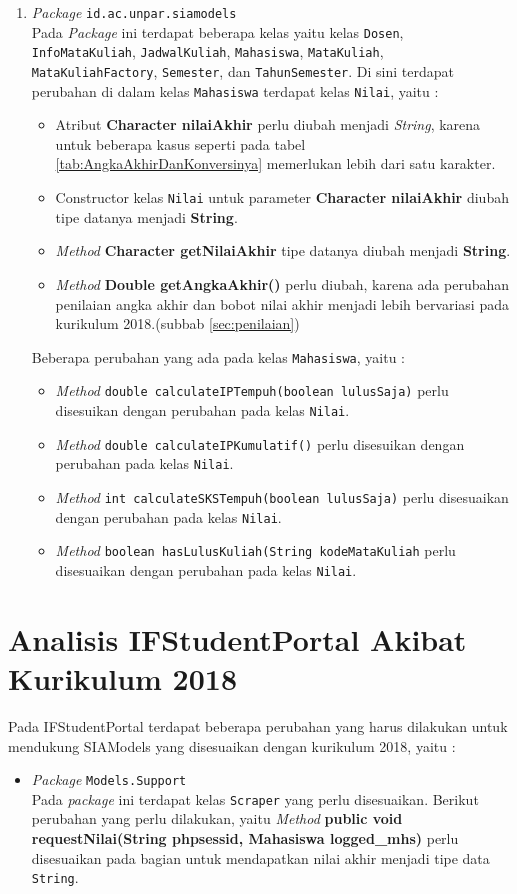\begin{enumerate}
	\item \textit{Package} \texttt{id.ac.unpar.siamodels}\\
	Pada \textit{Package} ini terdapat beberapa kelas yaitu kelas \texttt{Dosen}, \texttt{InfoMataKuliah}, \texttt{JadwalKuliah}, \texttt{Mahasiswa}, \texttt{MataKuliah}, \texttt{MataKuliahFactory}, \texttt{Semester}, dan \texttt{TahunSemester}. Di sini terdapat perubahan di dalam kelas \texttt{Mahasiswa} terdapat kelas \texttt{Nilai}, yaitu :
	\begin{itemize}
		\item Atribut \textbf{Character nilaiAkhir} perlu diubah menjadi \textit{String}, karena untuk beberapa kasus seperti pada tabel \ref{tab:AngkaAkhirDanKonversinya} memerlukan lebih dari satu karakter.
		\item Constructor kelas \texttt{Nilai} untuk parameter \textbf{Character nilaiAkhir} diubah tipe datanya menjadi \textbf{String}.
		\item \textit{Method} \textbf{Character getNilaiAkhir} tipe datanya diubah menjadi \textbf{String}.
		\item \textit{Method} \textbf{Double getAngkaAkhir()} perlu diubah, karena ada perubahan penilaian angka akhir dan bobot nilai akhir menjadi lebih bervariasi pada kurikulum 2018.(subbab \ref{sec:penilaian}) 
	\end{itemize}
	Beberapa perubahan yang ada pada kelas \texttt{Mahasiswa}, yaitu :
	\begin{itemize}
		\item \textit{Method} \texttt{double calculateIPTempuh(boolean lulusSaja)} perlu disesuikan dengan perubahan pada kelas \texttt{Nilai}.
		\item \textit{Method} \texttt{double calculateIPKumulatif()} perlu disesuikan dengan perubahan pada kelas \texttt{Nilai}.
		\item \textit{Method} \texttt{int calculateSKSTempuh(boolean lulusSaja)} perlu disesuaikan dengan perubahan pada kelas \texttt{Nilai}.
		\item \textit{Method} \texttt{boolean hasLulusKuliah(String kodeMataKuliah} perlu disesuaikan dengan perubahan pada kelas \texttt{Nilai}.
	\end{itemize}
\end{enumerate}

\section{Analisis IFStudentPortal Akibat Kurikulum 2018}
\label{subbab:analisisifstudentportal}

Pada IFStudentPortal terdapat beberapa perubahan yang harus dilakukan untuk mendukung SIAModels yang disesuaikan dengan kurikulum 2018, yaitu :
\begin{itemize}
	\item \textit{Package} \texttt{Models.Support} \\
	Pada \textit{package} ini terdapat kelas \texttt{Scraper} yang perlu disesuaikan. Berikut perubahan yang perlu dilakukan, yaitu \textit{Method} \textbf{public void requestNilai(String phpsessid, Mahasiswa logged\_mhs)} perlu disesuaikan pada bagian untuk mendapatkan nilai akhir menjadi tipe data \texttt{String}.
\end{itemize}
